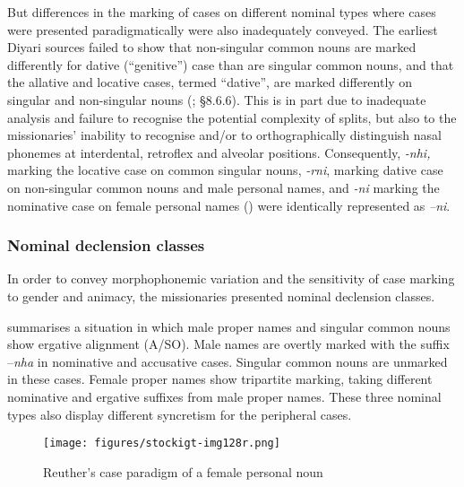 But differences in the marking of cases on different nominal types where cases were presented paradigmatically were also inadequately conveyed. The earliest Diyari sources failed to show that non-singular common nouns are marked differently for dative (“genitive'') case than are singular common nouns, and that the allative and locative cases, termed “dative'', are marked differently on singular and non-singular nouns (\citealt{Stockigt2017}; §8.6.6). This is in part due to inadequate analysis and failure to recognise the potential complexity of splits, but also to the missionaries' inability to recognise and/or to orthographically distinguish nasal phonemes at interdental, retroflex and alveolar positions. Consequently, \textit{-nhi,} marking the locative case on common singular nouns, \textit{-rni}, marking dative case on non-singular common nouns and male personal names, and \textit{-ni} marking the nominative case on female personal names () were identically represented as \textit{–ni}.

\subsubsection{Nominal declension classes}
\label{sec:key:8.6.3.1}\label{bkm:Ref339541914}
\largerpage
In order to convey morphophonemic variation and the sensitivity of case marking to gender and animacy, the missionaries presented nominal declension classes.

 summarises a situation in which male proper names and singular common nouns show ergative alignment (A/SO). Male names are overtly marked with the suffix –\textit{nha} in nominative and accusative cases. Singular common nouns are unmarked in these cases. Female proper names show tripartite marking, taking different nominative and ergative suffixes from male proper names. These three nominal types also display different syncretism for the peripheral cases.


\begin{figure}[b]
\texttt{[image: figures/stockigt-img128r.png]}
\caption{Reuther’s case paradigm of a female personal noun \citeyearpar[11]{reuther_dieri_1894}}
\label{bkm:Ref449372220}\label{fig:key:8-179}
\end{figure}


